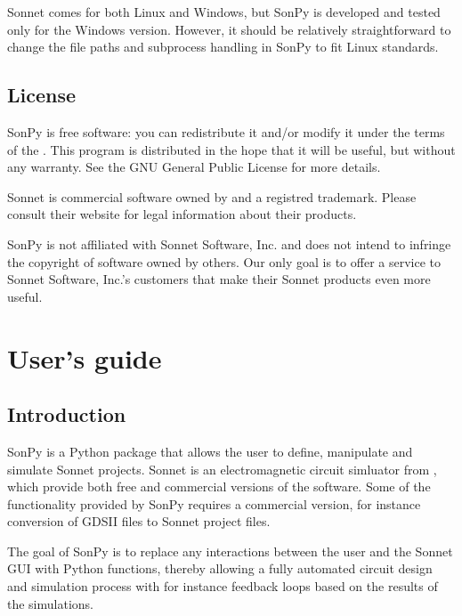 \documentclass[letterpaper,10pt,english,openany]{sphinxmanual}
\begin{document}
Sonnet comes for both Linux and Windows, but SonPy is developed and tested only for the Windows version. However, it should be relatively straightforward to change the file paths and subprocess handling in SonPy to fit Linux standards.


\section{License}
\label{\detokenize{source/about:license}}
SonPy is free software: you can redistribute it and/or modify it under the terms of the . This program is distributed in the hope that it will be useful, but without any warranty. See the GNU General Public License for more details.

Sonnet is commercial software owned by  and a registred trademark. Please consult their website for legal information about their products.

SonPy is not affiliated with Sonnet Software, Inc. and does not intend to infringe the copyright of software owned by others. Our only goal is to offer a service to Sonnet Software, Inc.’s customers that make their Sonnet products even more useful.


\chapter{User’s guide}
\label{\detokenize{source/users_guide:user-s-guide}}\label{\detokenize{source/users_guide::doc}}

\section{Introduction}
\label{\detokenize{source/users_guide:introduction}}
SonPy is a Python package that allows the user to define, manipulate and simulate Sonnet projects. Sonnet is an electromagnetic circuit simluator from , which provide both free and commercial versions of the software. Some of the functionality provided by SonPy requires a commercial version, for instance conversion of GDSII files to Sonnet project files.

The goal of SonPy is to replace any interactions between the user and the Sonnet GUI with Python functions, thereby allowing a fully automated circuit design and simulation process with for instance feedback loops based on the results of the simulations.
\end{document}
